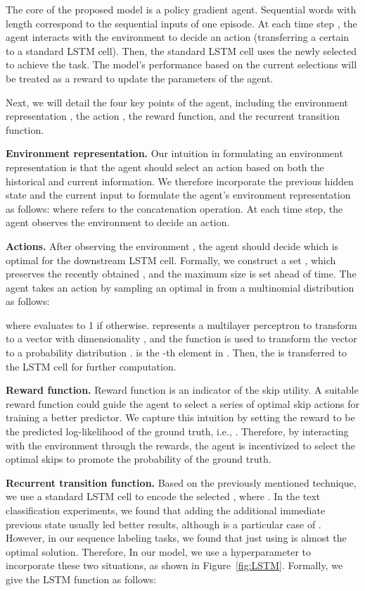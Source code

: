\documentclass[letterpaper]{article} \usepackage{aaai19}  \usepackage{times}  \usepackage{helvet}  \usepackage{courier}  \usepackage{url}  \usepackage{graphicx}  \usepackage{amsmath}
\begin{document}
The core of the proposed model is a policy gradient agent. Sequential words  with length  correspond to the sequential inputs of one episode. At each time step , the agent interacts with the environment  to decide an action  (transferring a certain  to a standard LSTM cell). Then, the standard LSTM cell uses the newly selected  to achieve the task. The model's performance based on the current selections will be treated as a reward to update the parameters of the agent. 

Next, we will detail the four key points of the agent, including the environment representation , the action , the reward function, and the recurrent transition function.

\noindent \textbf{Environment representation.} Our intuition in formulating an environment representation is that the agent should select an action based on both the historical and current information. We therefore incorporate the previous hidden state  and the current input  to formulate the agent's environment representation as follows: 
where  refers to the concatenation operation. At each time step, the agent observes the environment  to decide an action.

\noindent \textbf{Actions.} After observing the environment , the agent should decide which  is optimal for the downstream LSTM cell. Formally, we construct a  set , which preserves the  recently obtained , and the maximum size  is set ahead of time. The agent takes an action by sampling an optimal  in  from a multinomial distribution  as follows:
 
where  evaluates to 1 if  otherwise.  represents a multilayer perceptron to transform  to a vector with dimensionality , and the  function is used to transform the vector to a probability distribution .  is the -th element in . Then, the  is transferred to the LSTM cell for further computation.

\noindent \textbf{Reward function.} Reward function is an indicator of the skip utility. A suitable reward function could guide the agent to select a series of optimal skip actions for training a better predictor. We capture this intuition by setting the reward to be the predicted log-likelihood of the ground truth, i.e., . Therefore, by interacting with the environment through the rewards, the agent is incentivized to select the optimal skips to promote the probability of the ground truth.


\noindent \textbf{Recurrent transition function.} Based on the previously mentioned technique, we use a standard LSTM cell to encode the selected , where . In the text classification experiments, we found that adding the additional immediate previous state  usually led better results, although  is a particular case of . However, in our sequence labeling tasks, we found that just using  is almost the optimal solution. Therefore, In our model, we use a hyperparameter  to incorporate these two situations, as shown in Figure~\ref{fig:LSTM}. Formally, we give the LSTM function as follows:
\end{document}
